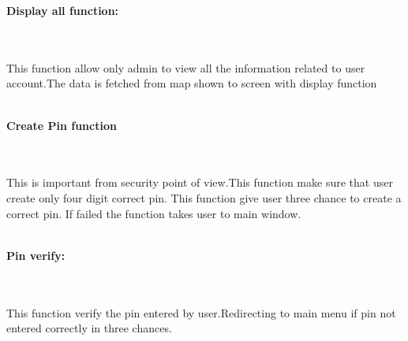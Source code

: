 \documentclass[11pt, a4paper]{article}
\begin{document}
\newpage
\begin{left}
    \textbf{\Large{Display all function:}}
\end{left}
\\\\
\large{This function allow only admin to view all the information related to user account.The data is fetched from map shown to screen with display function}
\\\\
\begin{left}
    \textbf{\large{Create Pin function}}
\end{left}
\\\\
\large{This is important from security point of view.This function make sure that user create only four digit correct pin.
This function give user three chance to create a correct pin.
If failed the function takes user to main window.
}
\\\\
\begin{left}
    \textbf{\large{Pin verify:}}
\end{left}
\\\\
\large{This function verify the pin entered by user.Redirecting to main menu if pin not entered correctly in three chances.
}

\vspace{1cm}
\end{document}

